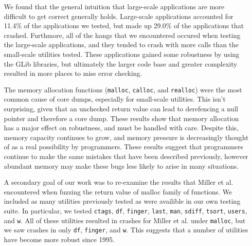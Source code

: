We found that the general intuition that large-scale applications are more difficult to get correct generally holds. Large-scale applications accounted for 11.4\% of the applications we tested, but made up 29.0\% of the applications that crashed. Furthmore, all of the hangs that we encountered occured when testing the large-scale applications, and they tended to crash with more calls than the small-scale utilities tested. These applications gained some robustness by using the GLib libraries, but ultimately the larger code base and greater complexity resulted in more places to miss error checking.

The memory allocation functions (\texttt{malloc}, \texttt{calloc}, and \texttt{realloc}) were the most common cause of core dumps, especially for small-scale utilities. This isn't surprising, given that an unchecked return value can lead to derefencing a null pointer and therefore a core dump. These results show that memory allocation has a major effect on robustness, and must be handled with care. Despite this, memory capacity continues to grow, and memory pressure is decreasingly thought of as a real possibility by programmers. These results suggest that programmers continue to make the same mistakes that have been described previously, however abundant memory may make these bugs less likely to arise in many situations.

A secondary goal of our work was to re-examine the results that Miller et al. encountered when fuzzing the return value of malloc family of functions. We included as many utilities previously tested as were availible in our own testing suite. In particular, we tested \texttt{ctags}, \texttt{df}, \texttt{finger}, \texttt{last}, \texttt{man}, \texttt{sdiff}, \texttt{tsort}, \texttt{users}, and \texttt{w}. All of these utilities resulted in crashes for Miller et al. under \texttt{malloc}, but we saw crashes in only \texttt{df}, \texttt{finger}, and \texttt{w}. This suggests that a number of utilities have become more robust since 1995.  
